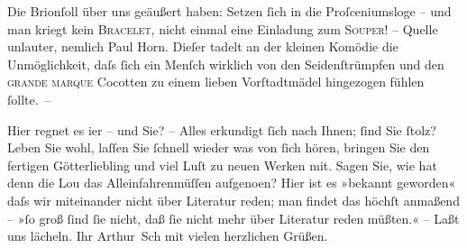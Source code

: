 \pstart
           Die Brionſoll über uns geäußert haben: Setzen ſich in die
               Proſceniumsloge – und {\pb}man kriegt kein \textsc{Bracelet}, nicht einmal eine Einladung zum \textsc{Souper}! – Quelle unlauter, nemlich Paul Horn. Dieſer tadelt an der kleinen Komödie die Unmöglichkeit, daſs ſich ein Menſch
               wirklich von den Seidenſtrümpfen und den \textsc{grande marque}
               Cocotten zu einem lieben Vorſtadtmädel hingezogen fühlen ſollte. –\pend
           
\pstart
           Hier regnet es i{\geminationm}er – und Sie? – Alles erkundigt ſich
               nach Ihnen; ſind Sie ſtolz? Leben Sie wohl, laſſen Sie ſchnell {\pb}wieder was von ſich hören, bringen Sie den fertigen
                  Götterliebling und viel
               Luſt zu neuen Werken mit. Sagen Sie, wie hat denn die Lou das Alleinfahrenmüſſen aufgeno{\geminationm}en? Hier ist es »bekannt geworden« daſs wir miteinander nicht über Literatur reden;
               man findet das höchſt anmaßend – »ſo groß ſind ſie nicht, daß ſie nicht mehr über
               Literatur reden müßten.« – Laßt uns lächeln.\pend
           \pstart Ihr \spacefill\mbox{Arthur Sch} mit vielen herzlichen Grüßen.\pend{}\endnumbering{}  
      